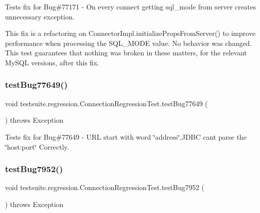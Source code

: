 Tests fix for Bug\#77171 -\/ On every connect getting sql\+\_\+mode from server creates unnecessary exception.

This fix is a refactoring on Connector\+Impl.\+initialize\+Props\+From\+Server() to improve performance when processing the S\+Q\+L\+\_\+\+M\+O\+DE value. No behavior was changed. This test guarantees that nothing was broken in these matters, for the relevant My\+S\+QL versions, after this fix. \mbox{\label{classtestsuite_1_1regression_1_1_connection_regression_test_ad3b1937f8602e34bfceaeaf3229c9e68}} 
\subsubsection{\texorpdfstring{test\+Bug77649()}{testBug77649()}}
{\footnotesize\ttfamily void testsuite.\+regression.\+Connection\+Regression\+Test.\+test\+Bug77649 (\begin{DoxyParamCaption}{ }\end{DoxyParamCaption}) throws Exception}

Tests fix for Bug\#77649 -\/ U\+RL start with word \char`\"{}address\char`\"{},J\+D\+BC can\textquotesingle{}t parse the \char`\"{}host\+:port\char`\"{} Correctly. \mbox{\label{classtestsuite_1_1regression_1_1_connection_regression_test_a678832d70128500168a8e75e47930a55}} 
\subsubsection{\texorpdfstring{test\+Bug7952()}{testBug7952()}}
{\footnotesize\ttfamily void testsuite.\+regression.\+Connection\+Regression\+Test.\+test\+Bug7952 (\begin{DoxyParamCaption}{ }\end{DoxyParamCaption}) throws Exception}

